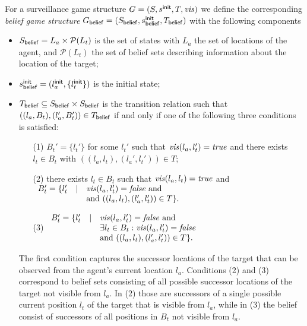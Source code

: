 For a surveillance game structure $G  = (S,s^{\mathsf{init}},T,\mathit{vis})$ we define the corresponding \emph{belief game structure} $G_{\mathsf{belief}}  = (S_{\mathsf{belief}},s^{\mathsf{init}}_{\mathsf{belief}},T_{\mathsf{belief}})$ with the following components
\begin{itemize}
\item $S_{\mathsf{belief}} = L_a \times \mathcal P(L_t)$ is the set of states with $L_a$ the set of locations of the agent, and $\mathcal P(L_t)$ the set of belief sets describing information about the location of the target;
\item $s^{\mathsf{init}}_{\mathsf{belief}} = (l_a^{\mathsf{init}},\{l_t^{\mathsf{init}}\})$ is the initial state;
\item $T_{\mathsf{belief}} \subseteq S_{\mathsf{belief}} \times S_{\mathsf{belief}}$ is the transition relation such that $((l_a, B_t),(l_a', B_t')) \in T_{\mathsf{belief}}$ if and only if one of the following three conditions is satisfied:
\begin{itemize}
\item[(1)] $B_t' = \{l_t'\}$ for some $l_t'$ such that $\mathit{vis}(l_a,l_t') = \mathit{true}$ and
there exists $l_t \in B_t$ with $((l_a,l_t),(l_a',l_t')) \in T$;
\item[(2)] there exists $l_t \in B_t$ such that $\mathit{vis}(l_a,l_t) = \mathit{true}$ and 
$\begin{array}{lll}
B_t' = \{l_t' & \mid & \mathit{vis}(l_a,l_t') = \mathit{false} \text{ and } \\
&& \text{and }  ((l_a,l_t),(l_a',l_t')) \in T\}.
\end{array}
$
\item[(3)] $\begin{array}{lll}
B_t' = \{l_t' & \mid & \mathit{vis}(l_a,l_t') = \mathit{false} \text{ and } \\
&& \exists l_t \in B_t: \mathit{vis}(l_a,l_t') = \mathit{false} \\
&& \text{and }  ((l_a,l_t),(l_a',l_t')) \in T\}.
\end{array}
$
\end{itemize}
The first condition captures the successor locations of the target that can be observed from the agent's current location $l_a$. Conditions (2) and (3) correspond to belief sets consisting of all possible successor locations of the target not visible from $l_a$. In (2) those are successors of a single possible current position $l_t$ of the target that is visible from $l_a$, while in (3) the belief consist of  successors of all positions in $B_t$ not visible from $l_a$.
\end{itemize}

 
\begin{example}
\end{example}

